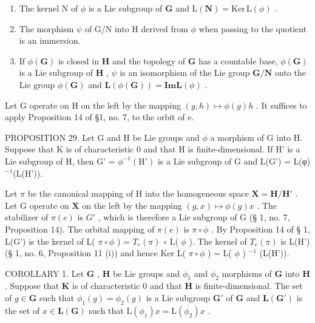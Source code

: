 \begin{enumerate}
\def\labelenumi{(\roman{enumi})}
\item
  The kernel N of \(\phi\) is a Lie subgroup of \(\mathbf{G}\) and \(\mathrm{L}(\mathbf{N}) = \mathrm{Ker} \, \mathrm{L}(\phi)\) .
\item
  The morphism \(\psi\) of G/N into H derived from \(\phi\) when passing to the quotient is an immersion.
\item
  If \(\phi(\mathbf{G})\) is closed in \(\mathbf{H}\) and the topology of \(\mathbf{G}\) has a countable base, \(\phi(\mathbf{G})\) is a Lie subgroup of \(\mathbf{H}\) , \(\psi\) is an isomorphism of the Lie group \(\mathbf{G}/\mathbf{N}\) onto the Lie group \(\phi(\mathbf{G})\) and \(\mathbf{L}(\phi(\mathbf{G})) = \mathbf{Im} \mathbf{L}(\phi)\) .
\end{enumerate}

Let G operate on H on the left by the mapping \((g, h) \mapsto \phi(g)h\) . It suffices to apply Proposition 14 of §1, no. 7, to the orbit of e.

PROPOSITION 29. Let G and H be Lie groups and \(\phi\) a morphism of G into H. Suppose that K is of characteristic 0 and that H is finite-dimensional. If H' is a Lie subgroup of H, then G' = \(\phi^{-1}(\mathrm{H}')\) is a Lie subgroup of G and L(G') = L(φ)\(^{-1}\)(L(H')).

Let \(\pi\) be the canonical mapping of H into the homogeneous space \(\mathbf{X} = \mathbf{H} / \mathbf{H}'\) . Let G operate on \(\mathbf{X}\) on the left by the mapping \((g, x) \mapsto \phi(g)x\) . The stabilizer of \(\pi(e)\) is \(G'\) , which is therefore a Lie subgroup of G (§ 1, no. 7, Proposition 14). The orbital mapping of \(\pi(e)\) is \(\pi \circ \phi\) . By Proposition 14 of § 1, L(G') is the kernel of L( \(\pi \circ \phi\) ) = \(T_e(\pi)\) \(\circ\) L( \(\phi\) ). The kernel of \(T_e(\pi)\) is L(H') (§ 1, no. 6, Proposition 11 (i)) and hence Ker L( \(\pi \circ \phi\) ) = L( \(\phi\) ) \(^{-1}\) (L(H')).

COROLLARY 1. Let \(\mathbf{G}\) , \(\mathbf{H}\) be Lie groups and \(\phi_1\) and \(\phi_2\) morphisms of \(\mathbf{G}\) into \(\mathbf{H}\) . Suppose that \(\mathbf{K}\) is of characteristic 0 and that \(\mathbf{H}\) is finite-dimensional. The set of \(g \in \mathbf{G}\) such that \(\phi_1(g) = \phi_2(g)\) is a Lie subgroup \(\mathbf{G}'\) of \(\mathbf{G}\) and \(\mathbf{L}(\mathbf{G}')\) is the set of \(x \in \mathbf{L}(\mathbf{G})\) such that \(\mathrm{L}(\phi_1)x = \mathrm{L}(\phi_2)x\) .

